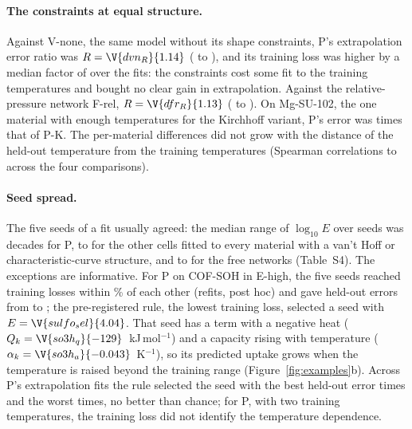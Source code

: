 \documentclass[journal=jcisd8,manuscript=article]{achemso}
\begin{document}
\paragraph{The constraints at equal structure.} Against V-none, the same model without its shape constraints,
P's extrapolation error ratio was $R = \V{dvn_R}{1.14}$ ( to ), and its training loss
was higher by a median factor of  over the  fits: the constraints
cost some fit to the training temperatures and bought no clear gain in extrapolation. Against the
relative-pressure network F-rel, $R = \V{dfr_R}{1.13}$ ( to ). On Mg-SU-102, the
one material with enough temperatures for the Kirchhoff variant, P's error was  times that of P-K.
The per-material differences did not grow with the distance of the held-out temperature from the training
temperatures (Spearman correlations  to  across the four comparisons).

\paragraph{Seed spread.} The five seeds of a fit usually agreed: the median range of $\log_{10} E$ over seeds was
 decades for P,  to  for the other cells fitted to every material with a van't Hoff
or characteristic-curve structure, and  to  for the free networks (Table~S4). The exceptions
are informative. For P on COF-SOH in E-high, the five seeds reached training losses within
\% of each other (refits, post hoc) and gave held-out errors from 
to ; the pre-registered rule, the lowest training loss, selected a seed with
$E = \V{sulfo_sel}{4.04}$. That seed has a term with a negative heat ($Q_k = \V{so3h_q}{-129}$~kJ\,mol$^{-1}$) and a
capacity rising with temperature ($\alpha_k = \V{so3h_a}{-0.043}$~K$^{-1}$), so its predicted uptake grows when the
temperature is raised beyond the training range (Figure~\ref{fig:examples}b). Across P's
 extrapolation fits the rule selected the seed with the best held-out error 
times and the worst  times, no better than chance; for P, with two training temperatures,
the training loss did not identify the temperature dependence.
\end{document}
